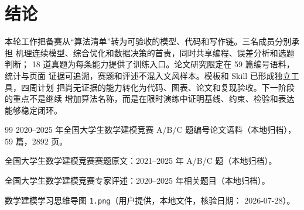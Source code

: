 \section{结论}

本轮工作把备赛从“算法清单”转为可验收的模型、代码和写作链。三名成员分别承担
机理连续模型、综合优化和数据决策的首责，同时共享编程、误差分析和选题判断；
18 道真题为每条能力提供了训练入口。论文研究限定在 59 篇编号语料，统计与页面
证据可追溯，赛题和评述不混入文风样本。模板和 Skill 已形成独立工具，四周计划
把尚无证据的能力转化为代码、图表、论文和复现验收。下一阶段的重点不是继续
增加算法名称，而是在限时演练中证明基线、约束、检验和表达能够稳定闭环。

\begin{thebibliography}{99}
2020--2025 年全国大学生数学建模竞赛 A/B/C 题编号论文语料（本地归档），
59 篇，2892 页。

全国大学生数学建模竞赛赛题原文：2021--2025 年 A/B/C 题（本地归档）。

全国大学生数学建模竞赛专家评述：2020--2025 年相关题目（本地归档）。

数学建模学习思维导图 \texttt{1.png}（用户提供，本地文件，核验日期：
2026-07-28）。
\end{thebibliography}

\appendix
